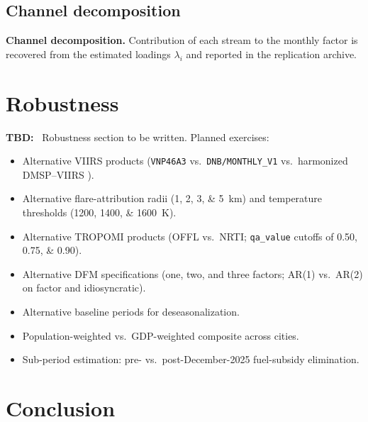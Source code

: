 \documentclass[11pt,letterpaper]{article}
\newenvironment{tbd}{\begin{tbdbox}\noindent\textbf{\color{yellow!60!black}TBD:}\ }{\end{tbdbox}}
\newcommand{\claim}[1]{\textbf{#1.}}
\begin{document}
\subsection{Channel decomposition}
\label{subsec:channels}
\claim{Channel decomposition} Contribution of each stream to the monthly factor is recovered from the estimated loadings $\lambda_i$ and reported in the replication archive.



\section{Robustness}
\label{sec:robustness}

\begin{tbd}
Robustness section to be written. Planned exercises:
\begin{itemize}[nosep]
\item Alternative VIIRS products (\texttt{VNP46A3} vs.\ \texttt{DNB/MONTHLY\_V1} vs.\ harmonized DMSP--VIIRS \citep{li_harmonized_2020}).
\item Alternative flare-attribution radii (\numlist{1;2;3;5}~km) and temperature thresholds (\numlist{1200;1400;1600}~K).
\item Alternative TROPOMI products (OFFL vs.\ NRTI; \texttt{qa\_value} cutoffs of \numlist{0.50;0.75;0.90}).
\item Alternative DFM specifications (one, two, and three factors; AR(\num{1}) vs.\ AR(\num{2}) on factor and idiosyncratic).
\item Alternative baseline periods for deseasonalization.
\item Population-weighted vs.\ GDP-weighted composite across cities.
\item Sub-period estimation: pre- vs.\ post-December-\num{2025} fuel-subsidy elimination.
\end{itemize}
\end{tbd}

\section{Conclusion}
\label{sec:conclusion}
\end{document}
